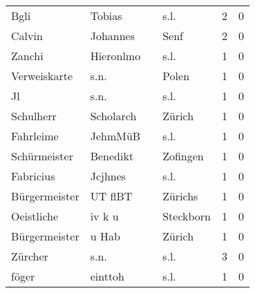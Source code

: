 \begin{tabular}{llllrr}
                     Bgli &                             Tobias &             &                                        s.l. &          2 &         0 \\
                   Calvin &                           Johannes &             &                                        Senf &          2 &         0 \\
                   Zanchi &                          Hieronlmo &             &                                        s.l. &          1 &         0 \\
             Verweiskarte &                               s.n. &             &                                       Polen &          1 &         0 \\
                       Jl &                               s.n. &             &                                        s.l. &          1 &         0 \\
                Schulherr &                          Scholarch &             &                                      Zürich &          1 &         0 \\
                Fahrleime &                            JehmMüB &             &                                        s.l. &          1 &         0 \\
             Schürmeister &                           Benedikt &             &                                    Zofingen &          1 &         0 \\
                Fabricius &                            Jcjhnes &             &                                        s.l. &          1 &         0 \\
            Bürgermeister &                            UT flBT &             &                                     Zürichs &          1 &         0 \\
               Oeistliche &                             iv k u &             &                                   Steckborn &          1 &         0 \\
            Bürgermeister &                              u Hab &             &                                      Zürich &          1 &         0 \\
                  Zürcher &                               s.n. &             &                                        s.l. &          3 &         0 \\
                    föger &                            einttoh &             &                                        s.l. &          1 &         0 \\

\end{tabular}
